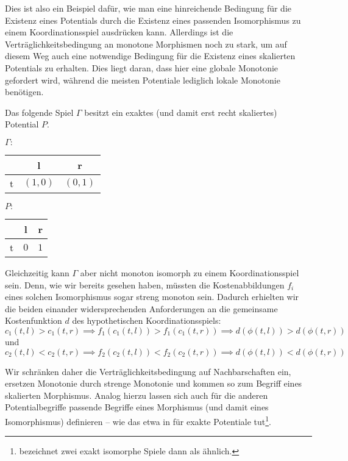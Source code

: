 Dies ist also ein Beispiel dafür, wie man eine hinreichende Bedingung für die Existenz eines Potentials durch die Existenz eines passenden Isomorphismus zu einem Koordinationsspiel ausdrücken kann. Allerdings ist die Verträglichkeitsbedingung an monotone Morphismen noch zu stark, um auf diesem Weg auch eine notwendige Bedingung für die Existenz eines skalierten Potentials zu erhalten. Dies liegt daran, dass hier eine globale Monotonie gefordert wird, während die meisten Potentiale lediglich lokale Monotonie benötigen.

\begin{bsp}
	Das folgende Spiel $\Gamma$ besitzt ein exaktes (und damit erst recht skaliertes) Potential $P$.
	\begin{center}
		$\Gamma:$ \quad
		\begin{tabular}{c||c|c}
				& l 		& r 		\\\hline\hline
			t	& $(1,0)$	& $(0,1)$	
		\end{tabular}\hspace{5em}
		$P:$ \quad
		\begin{tabular}{c||c|c}
				& l 		& r 		\\\hline\hline
			t	& $0$		& $1$		
		\end{tabular}
	\end{center}
	Gleichzeitig kann $\Gamma$ aber nicht monoton isomorph zu einem Koordinationsspiel sein. Denn, wie wir bereits gesehen haben, müssten die Kostenabbildungen $f_i$ eines solchen Isomorphismus sogar streng monoton sein. Dadurch erhielten wir die beiden einander widersprechenden Anforderungen an die gemeinsame Kostenfunktion $d$ des hypothetischen Koordinationsspiels:
		\[c_1(t,l) > c_1(t,r) \implies f_1(c_1(t,l)) > f_1(c_1(t,r)) \implies d(\phi(t,l)) > d(\phi(t,r)) \]
	und 
		\[c_2(t,l) < c_2(t,r) \implies f_2(c_2(t,l)) < f_2(c_2(t,r)) \implies d(\phi(t,l)) < d(\phi(t,r)) \]
\end{bsp}

Wir schränken daher die Verträglichkeitsbedingung auf Nachbarschaften ein, ersetzen Monotonie durch strenge Monotonie und kommen so zum Begriff eines skalierten Morphismus. Analog hierzu lassen sich auch für die anderen Potentialbegriffe passende Begriffe eines Morphismus (und damit eines Isomorphismus) definieren -- wie das etwa \citeauthor{ReprOfFiniteGamesAsNCG} in \cite[Abschnitt 2.1]{ReprOfFiniteGamesAsNCG} für exakte Potentiale tut\footnote{\citeauthor{ReprOfFiniteGamesAsNCG} bezeichnet zwei exakt isomorphe Spiele dann als \glqq ähnlich\grqq.}.


